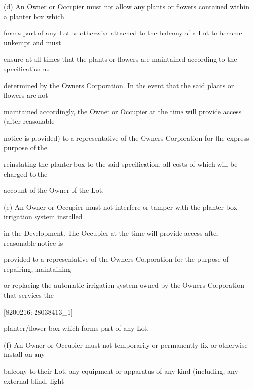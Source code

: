 \documentclass{article}
\begin{document}
{\fontsize{9.962}{1}(d) An Owner or Occupier must not allow any plants or flowers contained within a planter box which }

{\fontsize{10.02}{1}forms part of any Lot or otherwise attached to the balcony of a Lot to become unkempt and must }

{\fontsize{10.02}{1}ensure at all times that the plants or flowers are maintained according to the specification as }

{\fontsize{10.02}{1}determined by the Owners Corporation. In the event that the said plants or flowers are not }

{\fontsize{10.02}{1}maintained accordingly, the Owner or Occupier at the time will provide access (after reasonable }

{\fontsize{10.02}{1}notice is provided) to a representative of the Owners Corporation for the express purpose of the }

{\fontsize{10.02}{1}reinstating the planter box to the said specification, all costs of which will be charged to the }

{\fontsize{10.02}{1}account of the Owner of the Lot. }

{\fontsize{9.962}{1}(e) An Owner or Occupier must not interfere or tamper with the planter box irrigation system installed }

{\fontsize{10.02}{1}in the Development. The Occupier at the time will provide access after reasonable notice is }

{\fontsize{10.02}{1}provided to a representative of the Owners Corporation for the purpose of repairing, maintaining }

{\fontsize{10.02}{1}or replacing the automatic irrigation system owned by the Owners Corporation that services the }

\newpage
















{\fontsize{7.02}{1}[8200216: 28038413\_1] }

{\fontsize{10.02}{1}planter/flower box which forms part of any Lot. }

{\fontsize{9.962}{1}(f) An Owner or Occupier must not temporarily or permanently fix or otherwise install on any }

{\fontsize{10.02}{1}balcony to their Lot, any equipment or apparatus of any kind (including, any external blind, light }
\end{document}
